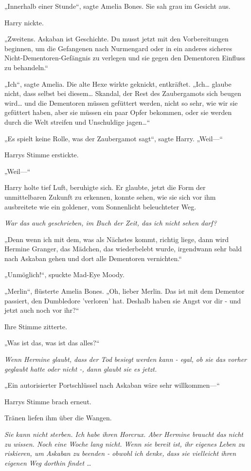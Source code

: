 {„Innerhalb einer Stunde“, sagte Amelia Bones. Sie sah grau im Gesicht aus.

Harry nickte.

„Zweitens. Askaban ist Geschichte. Du musst jetzt mit den Vorbereitungen beginnen, um die Gefangenen nach Nurmengard oder in ein anderes sicheres Nicht-Dementoren-Gefängnis zu verlegen und sie gegen den Dementoren Einfluss zu behandeln.“

„Ich“, sagte Amelia. Die alte Hexe wirkte geknickt, entkräftet. „Ich… glaube nicht, dass selbst bei diesem… Skandal, der Rest des Zaubergamots sich beugen wird… und die Dementoren müssen gefüttert werden, nicht so sehr, wie wir sie gefüttert haben, aber sie müssen ein paar Opfer bekommen, oder sie werden durch die Welt streifen und Unschuldige jagen…“

„Es spielt keine Rolle, was der Zaubergamot sagt“, sagte Harry. „Weil—“

Harrys Stimme erstickte.

„Weil—“

Harry holte tief Luft, beruhigte sich. Er glaubte, jetzt die Form der unmittelbaren Zukunft zu erkennen, konnte sehen, wie sie sich vor ihm ausbreitete wie ein goldener, vom Sonnenlicht beleuchteter Weg.

\emph{War das auch geschrieben, im Buch der Zeit, das ich nicht sehen darf?}

„Denn wenn ich mit dem, was als Nächstes kommt, richtig liege, dann wird Hermine Granger, das Mädchen, das wiederbelebt wurde, irgendwann sehr bald nach Askaban gehen und dort alle Dementoren vernichten.“

„Unmöglich!“, spuckte Mad-Eye Moody.

„Merlin“, flüsterte Amelia Bones. „Oh, lieber Merlin. Das ist mit dem Dementor passiert, den Dumbledore 'verloren' hat. Deshalb haben sie Angst vor dir - und jetzt auch noch vor ihr?“

Ihre Stimme zitterte.

„Was ist das, was ist das alles?“

\emph{Wenn Hermine glaubt, dass der Tod besiegt werden kann - egal, ob sie das vorher geglaubt hatte oder nicht -, dann glaubt sie es jetzt.}

„Ein autorisierter Portschlüssel nach Askaban wäre sehr willkommen—“

Harrys Stimme brach erneut.

Tränen liefen ihm über die Wangen.

\emph{Sie kann nicht sterben. Ich habe ihren Horcrux. Aber Hermine braucht das nicht zu wissen. Noch eine Woche lang nicht. Wenn sie bereit ist, ihr eigenes Leben zu riskieren, um Askaban zu beenden - obwohl ich denke, dass sie vielleicht ihren eigenen Weg dorthin findet …}

}
